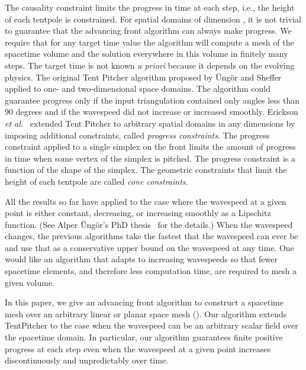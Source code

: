\documentclass[twocolumn]{article}
\def\etal{\textsl{et al.}}
\def\Ungor{\"Ung\"or}
\begin{document}
The causality constraint limits the progress in time at each step,
i.e., the height of each tentpole is constrained.  For spatial domains
of dimension , it is not trivial to guarantee that the
advancing front algorithm can always make progress.  We require that
for any target time value  the algorithm will compute a mesh of the
spacetime volume  and the solution everywhere in
this volume in finitely many steps.  The target time  is not known
\textit{a priori} because it depends on the evolving physics.
The original Tent Pitcher algorithm proposed by \Ungor{} and
Sheffer~\cite{ungor00tentpitcher} applied to one- and two-dimensional
space domains.  The algorithm could guarantee progress only if the
input triangulation contained only angles less than 90 degrees and if
the wavespeed did not increase or increased smoothly.  Erickson
\etal~\cite{erickson02building} extended Tent Pitcher to arbitrary
spatial domains in any dimensions by imposing additional constraints,
called \emph{progress constraints}.  The progress constraint applied
to a single simplex on the front limits the amount of progress in time
when some vertex of the simplex is pitched.  The progress constraint
is a function of the shape of the simplex.  The geometric constraints
that limit the height of each tentpole are called \emph{cone
  constraints}.

All the results so far have applied to the case where the wavespeed at
a given point is either constant, decreasing, or increasing smoothly
as a Lipschitz function.  (See Alper \Ungor{}'s PhD
thesis~\cite{ungor02phd} for the details.)  When the wavespeed
changes, the previous algorithms take the fastest that the wavespeed
can ever be and use that as a conservative upper bound on the
wavespeed at any time.  One would like an algorithm that adapts to
increasing wavespeeds so that fewer spacetime elements, and therefore
less computation time, are required to mesh a given volume.


In this paper, we give an advancing front algorithm to construct a
spacetime mesh over an arbitrary linear or planar space mesh ().  Our algorithm extends TentPitcher to the case when the wavespeed
can be an arbitrary scalar field over the spacetime domain.  In
particular, our algorithm guarantees finite positive progress at each
step even when the wavespeed at a given point increases
discontinuously and unpredictably over time.
\end{document}
